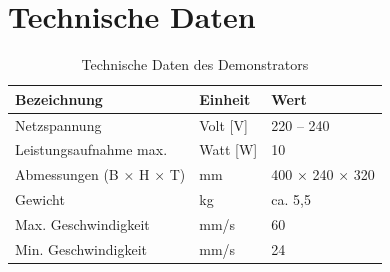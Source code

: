 \documentclass[a4paper,12pt,final]{report}
\begin{document}
	\chapter{Technische Daten}
	\begin{table}[h]
		\centering
		\begin{tabular}{|p{5cm}|p{3cm}|p{4cm}|}
			\hline
			\textbf{Bezeichnung} & \textbf{Einheit} & \textbf{Wert} \\ \hline
			Netzspannung & Volt [V] & 220 -- 240 \\ \hline
			Leistungsaufnahme max. & Watt [W] & 10 \\ \hline
			Abmessungen (B × H × T) & mm & 400 × 240 × 320 \\ \hline
			Gewicht & kg & ca. 5{,}5 \\ \hline
			Max. Geschwindigkeit & mm/s & 60 \\ \hline
			Min. Geschwindigkeit & mm/s & 24 \\ \hline
		\end{tabular}
		\caption{Technische Daten des Demonstrators}
		\label{tab:technische_daten}
	\end{table}
	
\end{document}
